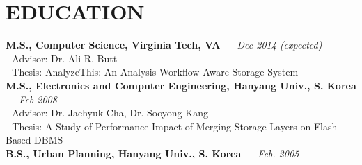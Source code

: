 \section{EDUCATION}
\vspace{0.07in} 
{\bf M.S., Computer Science, Virginia Tech, VA}
{\footnotesize{\it --- Dec 2014 (expected)}} \\
  - {\small Advisor: Dr. Ali R. Butt} \\
  - {\small Thesis: AnalyzeThis: An Analysis Workflow-Aware Storage System}
\vspace{0.02in}\\
{\bf M.S., Electronics and Computer Engineering, Hanyang Univ., S. Korea}
{\footnotesize{\it --- Feb 2008}}\\
  - {\small Advisor: Dr. Jaehyuk Cha, Dr. Sooyong Kang}\\
  - {\small Thesis: A Study of Performance Impact of Merging Storage Layers on
  Flash-Based DBMS}
\vspace{0.02in}\\
{\bf B.S., Urban Planning, Hanyang Univ., S. Korea}
{\footnotesize{\it --- Feb. 2005}}

